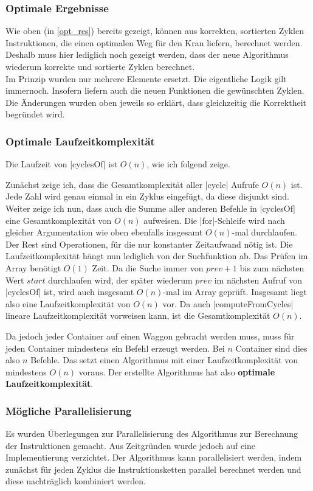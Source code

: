 \subsubsection{Optimale Ergebnisse}
Wie oben (in \ref{opt_res}) bereits gezeigt, können aus korrekten, sortierten Zyklen Instruktionen, die einen optimalen Weg für den Kran liefern, berechnet werden.
Deshalb muss hier lediglich noch gezeigt werden, dass der neue Algorithmus wiederum korrekte und sortierte Zyklen berechnet. \\
Im Prinzip wurden nur mehrere Elemente ersetzt. Die eigentliche Logik gilt immernoch. Insofern liefern auch die neuen Funktionen die gewünschten Zyklen.
Die Änderungen wurden oben jeweils so erklärt, dass gleichzeitig die Korrektheit begründet wird.

\subsubsection{Optimale Laufzeitkomplexität}
Die Laufzeit von |cyclesOf| ist $O(n)$, wie ich folgend zeige.

Zunächst zeige ich, dass die Gesamtkomplexität aller |cycle| Aufrufe $O(n)$ ist.
Jede Zahl wird genau einmal in ein Zyklus eingefügt, da diese disjunkt sind.
Weiter zeige ich nun, dass auch die Summe aller anderen Befehle in |cyclesOf| eine Gesamtkomplexität von $O(n)$ aufweisen.
Die |for|-Schleife wird nach gleicher Argumentation wie oben ebenfalls insgesamt $O(n)$-mal durchlaufen.
Der Rest sind Operationen, für die nur konstanter Zeitaufwand nötig ist. Die Laufzeitkomplexität hängt nun lediglich von der Suchfunktion ab.
Das Prüfen im Array benötigt $O(1)$ Zeit. Da die Suche immer von $prev+1$ bis zum nächsten Wert $start$ durchlaufen wird, der später wiederum $prev$ im nächsten Aufruf von |cyclesOf| ist,
wird auch insgesamt $O(n)$-mal im Array geprüft. Insgesamt liegt also eine Laufzeitkomplexität von $O(n)$ vor.
Da auch |computeFromCycles| lineare Laufzeitkomplexität vorweisen kann, ist die Gesamtkomplexität $O(n)$.

Da jedoch jeder Container auf einen Waggon gebracht werden muss, muss für jeden Container mindestens ein Befehl erzeugt werden.
Bei $n$ Container sind dies also $n$ Befehle. Das setzt einen Algorithmus mit einer Laufzeitkomplexität von mindestens $O(n)$ voraus.
Der erstellte Algorithmus hat also \textbf{optimale Laufzeitkomplexität}.

\subsubsection{Mögliche Parallelisierung}
Es wurden Überlegungen zur Parallelisierung des Algorithmus zur Berechnung der Instruktionen gemacht.
Aus Zeitgründen wurde jedoch auf eine Implementierung verzichtet.
Der Algorithmus kann pa\-ral\-le\-li\-siert werden,
indem zunächst für jeden Zyklus die Instruktionsketten parallel berechnet werden und diese nachträglich kombiniert werden.
\clearpage

